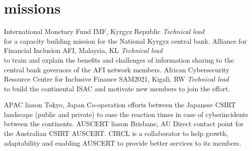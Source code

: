 \documentclass[a4paper]{friggeri-cv} %
\begin{document}

\newpage

\section{missions}
\begin{entrylist}
{International Monetary Fund}
{IMF, Kyrgyz Republic}
{\emph{Technical lead} \\ for a capacity building mission for the National Kyrgyz central bank.}
{Alliance for Financial Inclusion}
{AFI, Malaysia, KL}
{\emph{Technical lead} \\ to train and explain the benefits and challenges of information sharing to the central bank governors of the AFI network members.}
{African Cybersecurity Resource Centre for Inclusive Finance}
{SAM2021, Kigali, RW}
{\emph{Technical lead} \\ to build the continental ISAC and motivate new members to join the effort.}

{APAC liason}
{Tokyo, Japan}
{Co-operation efforts between the Japanese CSIRT landscape (public and private) to ease the reaction times in case of cyberincidents between the continents.}
{AUSCERT liason}
{Brisbane, AU}
{Direct contact point for the Australian CSIRT AUSCERT. CIRCL is a collaborator to help growth, adaptability and enabling AUSCERT to provide better services to its members.}
\end{entrylist}

\newpage

\end{document}
